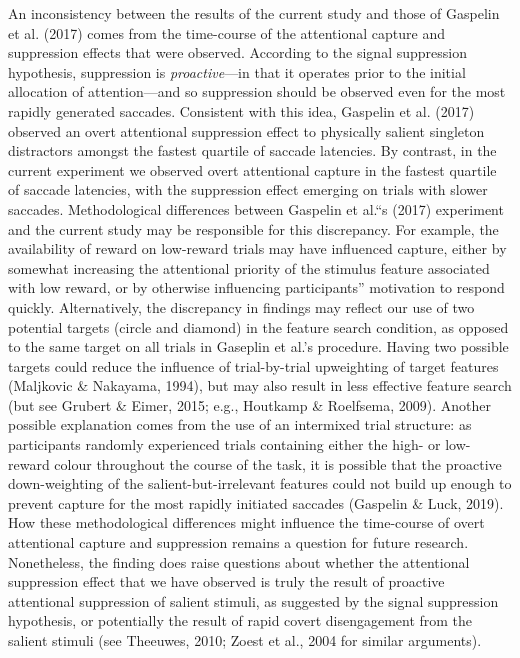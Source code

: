 \documentclass[man, a4paper, noextraspace, 11pt,floatsintext]{apa6}
\begin{document}
An inconsistency between the results of the current study and those of
Gaspelin et al. (2017) comes from the time-course of the attentional
capture and suppression effects that were observed. According to the
signal suppression hypothesis, suppression is \emph{proactive}---in that
it operates prior to the initial allocation of attention---and so
suppression should be observed even for the most rapidly generated
saccades. Consistent with this idea, Gaspelin et al. (2017) observed an
overt attentional suppression effect to physically salient singleton
distractors amongst the fastest quartile of saccade latencies. By
contrast, in the current experiment we observed overt attentional
capture in the fastest quartile of saccade latencies, with the
suppression effect emerging on trials with slower saccades.
Methodological differences between Gaspelin et al.\enquote{s (2017)
experiment and the current study may be responsible for this
discrepancy. For example, the availability of reward on low-reward
trials may have influenced capture, either by somewhat increasing the
attentional priority of the stimulus feature associated with low reward,
or by otherwise influencing participants} motivation to respond quickly.
Alternatively, the discrepancy in findings may reflect our use of two
potential targets (circle and diamond) in the feature search condition,
as opposed to the same target on all trials in Gaseplin et al.'s
procedure. Having two possible targets could reduce the influence of
trial-by-trial upweighting of target features (Maljkovic \& Nakayama,
1994), but may also result in less effective feature search (but see
Grubert \& Eimer, 2015; e.g., Houtkamp \& Roelfsema, 2009). Another
possible explanation comes from the use of an intermixed trial
structure: as participants randomly experienced trials containing either
the high- or low-reward colour throughout the course of the task, it is
possible that the proactive down-weighting of the salient-but-irrelevant
features could not build up enough to prevent capture for the most
rapidly initiated saccades (Gaspelin \& Luck, 2019). How these
methodological differences might influence the time-course of overt
attentional capture and suppression remains a question for future
research. Nonetheless, the finding does raise questions about whether
the attentional suppression effect that we have observed is truly the
result of proactive attentional suppression of salient stimuli, as
suggested by the signal suppression hypothesis, or potentially the
result of rapid covert disengagement from the salient stimuli (see
Theeuwes, 2010; Zoest et al., 2004 for similar arguments).
\end{document}
